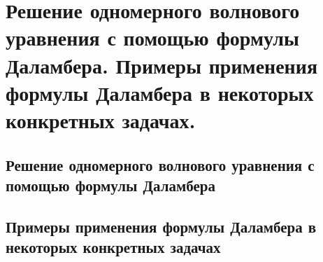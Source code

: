 \chapter{Решение одномерного волнового уравнения с помощью формулы Даламбера.
Примеры применения формулы Даламбера в некоторых конкретных задачах.}

\section{Решение одномерного волнового уравнения с помощью формулы Даламбера}
\section{Примеры применения формулы Даламбера в некоторых конкретных задачах}
\newpage

